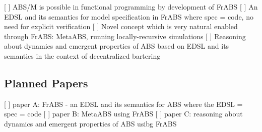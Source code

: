 [ ] ABS/M is possible in functional programming by development of FrABS
[ ] An EDSL and its semantics for model specification in FrABS where spec = code,  no need for explicit verification
[ ] Novel concept which is very natural enabled through FrABS: MetaABS, running locally-recursive simulations
[ ] Reasoning about  dynamics and emergent properties of ABS based on EDSL and its semantics in the context of decentralized bartering

\subsection{Planned Papers}
[ ] paper A: FrABS - an EDSL and its semantics for ABS where the EDSL = spec = code
[ ] paper B: MetaABS using FrABS
[ ] paper C: reasoning about dynamics and emergent properties of ABS usibg FrABS